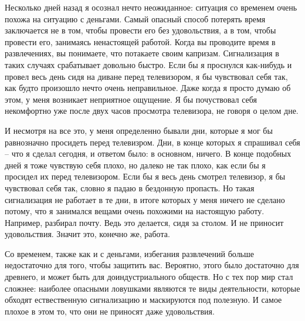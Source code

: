 \documentclass[ebook,12pt,oneside,openany]{memoir}
\begin{document}
Несколько дней назад я осознал нечто неожиданное: ситуация со временем
очень похожа на ситуацию с деньгами. Самый опасный способ потерять
время заключается не в том, чтобы провести его без удовольствия, а в
том, чтобы провести его, занимаясь ненастоящей работой. Когда вы
проводите время в развлечениях, вы понимаете, что потакаете своим
капризам. Сигнализация в таких случаях срабатывает довольно быстро.
Если бы я проснулся как-нибудь и провел весь день сидя на диване перед
телевизором, я бы чувствовал себя так, как будто произошло нечто очень
неправильное. Даже когда я просто думаю об этом, у меня возникает
неприятное ощущение. Я бы почуствовал себя некомфортно уже после двух
часов просмотра телевизора, не говоря о целом дне.

И несмотря на все это, у меня определенно бывали дни, которые я мог бы
равнозначно просидеть перед телевизром. Дни, в конце которых я
спрашивал себя – что я сделал сегодня, и ответом было: в основном,
ничего. В конце подобных дней я тоже чувствую себя плохо, но далеко не
так плохо, как если бы я просидел их перед телевизором. Если бы я весь
день смотрел телевизор, я бы чувствовал себя так, словно я падаю в
бездонную пропасть. Но такая сигнализация не работает в те дни, в
итоге которых у меня ничего не сделано потому, что я занимался вещами
очень похожими на настоящую работу. Например, разбирал почту. Ведь это
делается, сидя за столом. И не приносит удовольствия. Значит это,
конечно же, работа.

Со временем, также как и с деньгами, избегания развлечений больше
недостаточно для того, чтобы защитить вас. Вероятно, этого было
достаточно для древнего, и может быть для доиндустриального обществ.
Но с тех пор мир стал сложнее: наиболее опасными ловушками являются те
виды деятельности, которые обходят ествественную сигнализацию и
маскируются под полезную. И самое плохое в этом то, что они не
приносят даже удовольствия.
\end{document}
